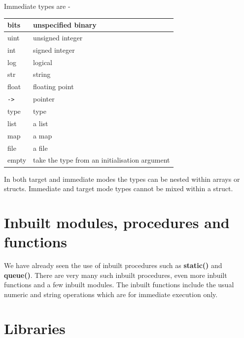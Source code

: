 \documentclass[10pt,a4paper,twoside,fleqn]{article}
\newcommand{\var}[1]{{\bf #1}} %
\begin{document}
    Immediate types are -

    \begin{tabular}{| l | l |}
    \hline
    bits      & unspecified binary                              \\ \hline
    uint      & unsigned integer                                \\ \hline
    int       & signed integer                                  \\ \hline
    log       & logical                                         \\ \hline
    str       & string                                          \\ \hline
    float     & floating point                                  \\ \hline
    \verb'->' & pointer                                         \\ \hline
    type      & type                                            \\ \hline
    list      & a list                                          \\ \hline
    map       & a map                                           \\ \hline
    file      & a file                                          \\ \hline
    empty     & take the type from an initialisation argument   \\ \hline
    \end{tabular}
    
    In both target and immediate modes the types can be nested within
    arrays or structs. Immediate and target mode types cannot be mixed
    within a struct.


\section{Inbuilt modules, procedures and functions}

    We have already seen the use of inbuilt procedures such as \var{static()}
    and \var{queue()}. There are very many such inbuilt procedures, even more
    inbuilt functions and a few inbuilt modules. The inbuilt functions include
    the usual numeric and string operations which are for immediate execution only.



\section{Libraries}
\end{document}
